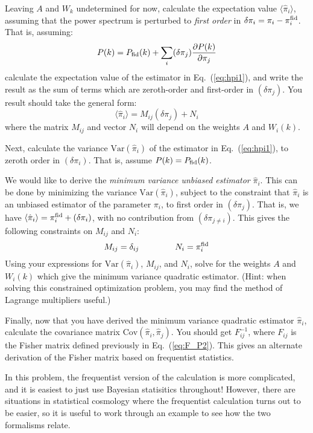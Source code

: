 \documentclass[aps,prd,superscriptaddress,groupedaddress,nofootinbib,nobibnotes]{revtex4}
\newcommand{\be}{\begin{equation}}
\newcommand{\ee}{\end{equation}}
\def\Var{\mbox{Var}}
\def\hpi{{\hat\pi}}
\begin{document}
\begin{enumerate}
  Leaving $A$ and $W_k$ undetermined for now, calculate the expectation value $\langle \hpi_i \rangle$, assuming that
  the power spectrum is perturbed to {\em first order} in $\delta\pi_i = \pi_i - \pi_i^{\rm fid}$.  That is, assuming:
\be
  P(k) = P_{\rm fid}(k) + \sum_i (\delta \pi_j) \frac{\partial P(k)}{\partial\pi_j}
\ee
  calculate the expectation value of the estimator in Eq.~(\ref{eq:hpi1}), and write the result as the sum of terms
  which are zeroth-order and first-order in $(\delta\pi_j)$.  You result should take the general form:
\be
  \langle \hpi_i \rangle = M_{ij} (\delta \pi_j) + N_i
\ee
  where the matrix $M_{ij}$ and vector $N_i$ will depend on the weights $A$ and $W_i(k)$.

  Next, calculate the variance $\Var(\hpi_i)$ of the estimator in Eq.~(\ref{eq:hpi1}), to zeroth order in $(\delta\pi_i)$.
  That is, assume $P(k) = P_{\rm fid}(k)$.

  We would like to derive the {\em minimum variance unbiased estimator} $\hpi_i$.
  This can be done by minimizing the variance $\Var(\hpi_i)$, subject to the constraint that $\hpi_i$ is an unbiased estimator
  of the parameter $\pi_i$, to first order in $(\delta\pi_j)$.
  That is, we have $\langle \hpi_i \rangle = \pi_i^{\rm fid} + (\delta\pi_i)$, with no contribution from $(\delta\pi_{j \ne i})$.
  This gives the following constraints on $M_{ij}$ and $N_i$:
\be
 M_{ij} = \delta_{ij}
   \hspace{1.5cm}
 N_i = \pi_i^{\rm fid}
\ee
  Using your expressions for $\Var(\hpi_i)$, $M_{ij}$, and $N_i$, solve for the weights $A$ and $W_i(k)$ which
  give the minimum variance quadratic estimator.  (Hint: when solving this constrained optimization problem, you
  may find the method of Lagrange multipliers useful.)

  Finally, now that you have derived the minimum variance quadratic estimator $\hpi_i$,
  calculate the covariance matrix $\mbox{Cov}(\hpi_i, \hpi_j)$.  You should get $F^{-1}_{ij}$,
  where $F_{ij}$ is the Fisher matrix defined previously in Eq.~(\ref{eq:F_P2}).  This gives
  an alternate derivation of the Fisher matrix based on frequentist statistics.  

  In this problem, the frequentist version of the calculation is more complicated,
  and it is easiest to just use Bayesian statisitics throughout!  However, there are
  situations in statistical cosmology where the frequentist calculation turns out to be
  easier, so it is useful to work through an example to see how the two formalisms relate.
\end{enumerate}
\end{document}

